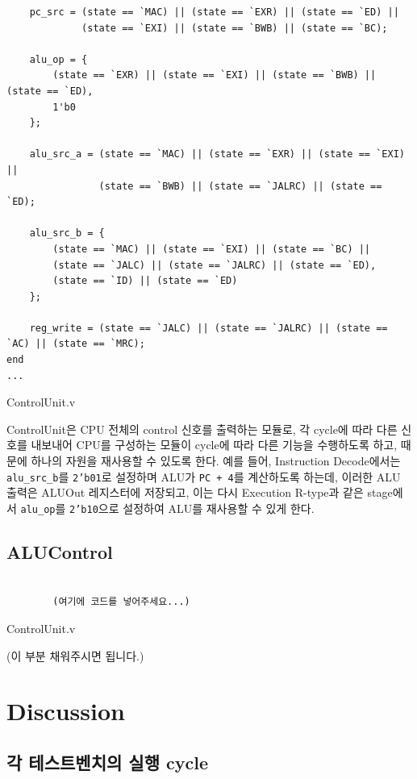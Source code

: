 \documentclass[openright, a4paper]{article}
\newenvironment{longlisting}{\captionsetup{type=listing}}{}
\newcommand{\code}[1]{\texttt{#1}}
\begin{document}
\begin{longlisting}
\begin{verbatim}
    pc_src = (state == `MAC) || (state == `EXR) || (state == `ED) ||
             (state == `EXI) || (state == `BWB) || (state == `BC);

    alu_op = {
        (state == `EXR) || (state == `EXI) || (state == `BWB) || (state == `ED),
        1'b0
    };

    alu_src_a = (state == `MAC) || (state == `EXR) || (state == `EXI) ||
                (state == `BWB) || (state == `JALRC) || (state == `ED);

    alu_src_b = {
        (state == `MAC) || (state == `EXI) || (state == `BC) || 
        (state == `JALC) || (state == `JALRC) || (state == `ED),
        (state == `ID) || (state == `ED)
    };

    reg_write = (state == `JALC) || (state == `JALRC) || (state == `AC) || (state == `MRC);
end
...
    \end{verbatim}
    \caption{ControlUnit.v}
\end{longlisting}
\break

ControlUnit은 CPU 전체의 control 신호를 출력하는 모듈로, 각 cycle에 따라 다른
신호를 내보내어 CPU를 구성하는 모듈이 cycle에 따라 다른 기능을 수행하도록 하고, 
때문에 하나의 자원을 재사용할 수 있도록 한다. 예를 들어, Instruction 
Decode에서는 \code{alu_src_b}를 \code{2'b01}로 설정하며 ALU가 \code{PC + 4}를
계산하도록 하는데, 이러한 ALU 출력은 ALUOut 레지스터에 저장되고, 이는 다시
Execution R-type과 같은 stage에서 \code{alu_op}를 \code{2'b10}으로 설정하여
ALU를 재사용할 수 있게 한다.

\subsection{ALUControl}
\begin{longlisting}
    \begin{verbatim}

        (여기에 코드를 넣어주세요...)

    \end{verbatim}
    \caption{ControlUnit.v}
\end{longlisting}

(이 부분 채워주시면 됩니다.)

\section{Discussion}
\subsection{각 테스트벤치의 실행 cycle}
\end{document}
